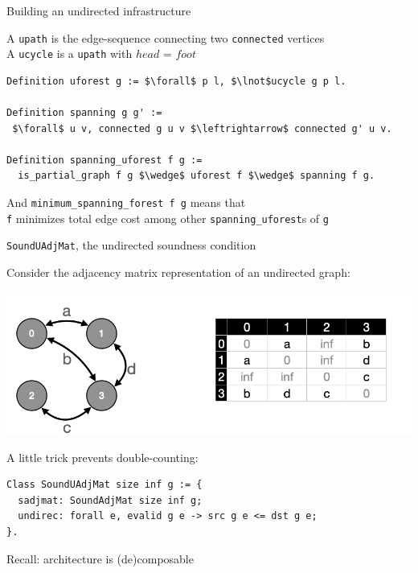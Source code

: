 \documentclass[usenames, xcolor=dvipsnames]{beamer}
\newcommand{\m}[1]{\ensuremath{\mathit{#1}}} %
\begin{document}
\begin{frame}[fragile]{Building an undirected infrastructure}

A \texttt{upath} is the edge-sequence connecting two \texttt{connected} vertices \\
A \texttt{ucycle} is a \texttt{upath} with \m{head} = \m{foot}
\bigskip \pause
\begin{lstlisting}
Definition uforest g := $\forall$ p l, $\lnot$ucycle g p l.

Definition spanning g g' :=
 $\forall$ u v, connected g u v $\leftrightarrow$ connected g' u v.

Definition spanning_uforest f g :=
  is_partial_graph f g $\wedge$ uforest f $\wedge$ spanning f g.
\end{lstlisting}

\bigskip \pause
And \texttt{minimum\_spanning\_forest f g} means that \\
\texttt{f} minimizes total edge cost among other \texttt{spanning\_uforest}s of \texttt{g}

\end{frame}

\begin{frame}[fragile]{\texttt{SoundUAdjMat}, the undirected soundness condition}

Consider the adjacency matrix representation of an undirected graph: \\

{\centering
\includegraphics[scale=0.5]{undirected}

}

\bigskip \pause
A little trick prevents double-counting:
\begin{Verbatim}
Class SoundUAdjMat size inf g := {
  sadjmat: SoundAdjMat size inf g;
  undirec: forall e, evalid g e -> src g e <= dst g e;
}.
\end{Verbatim}
\end{frame}

\begin{frame}{Recall: architecture is (de)composable}
  \centering
  \colorbox{lightg}{\scalebox{.85}{}}
\end{frame}
\end{document}
